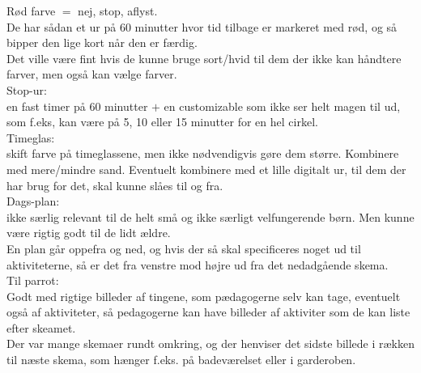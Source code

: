 R\o{}d farve $=$ nej, stop, aflyst.\\

De har s\aa{}dan et ur p\aa{} 60 minutter hvor tid tilbage er markeret med r\o{}d, og s\aa{} bipper den lige kort n\aa{}r den er f\ae{}rdig.\\
  Det ville v\ae{}re fint hvis de kunne bruge sort/hvid til dem der ikke kan h\aa{}ndtere farver, men ogs\aa{} kan v\ae{}lge farver.\\

Stop-ur:\\
en fast timer p\aa{} 60 minutter $+$ en customizable som ikke ser helt magen til ud, som f.eks, kan v\ae{}re p\aa{} 5, 10 eller 15 minutter for en hel cirkel.\\

Timeglas:\\
skift farve p\aa{} timeglassene, men ikke n\o{}dvendigvis g\o{}re dem st\o{}rre. Kombinere med mere/mindre sand. Eventuelt kombinere med et lille digitalt ur, til dem der har brug for det, skal kunne sl\aa{}es til og fra.\\

Dags-plan:\\
ikke s\ae{}rlig relevant til de helt sm\aa{} og ikke s\ae{}rligt velfungerende b\o{}rn. Men kunne v\ae{}re rigtig godt til de lidt \ae{}ldre.\\
   En plan g\aa{}r oppefra og ned, og hvis der s\aa{} skal specificeres noget ud til aktiviteterne, s\aa{} er det fra venstre mod h\o{}jre ud fra det nedadg\aa{}ende skema.\\

Til parrot:\\
Godt med rigtige billeder af tingene, som p\ae{}dagogerne selv kan tage, eventuelt ogs\aa{} af aktiviteter, s\aa{} pedagogerne kan have billeder af aktiviter som de kan liste efter skeamet.\\

Der var mange skemaer rundt omkring, og der henviser det sidste billede i r\ae{}kken til n\ae{}ste skema, som h\ae{}nger f.eks. p\aa{} badev\ae{}relset eller i garderoben.